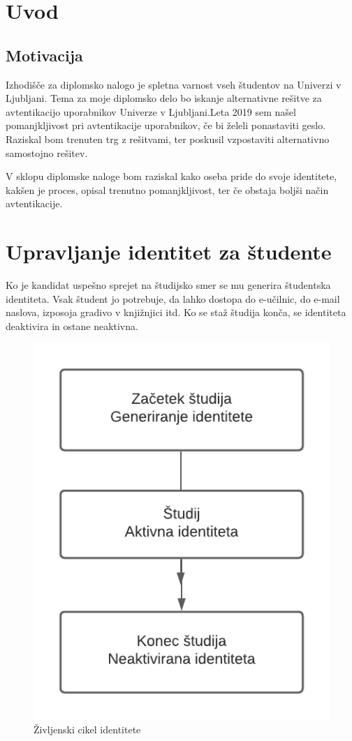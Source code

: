 \documentclass[a4paper,12pt,openright]{book}
\begin{document}
\chapter{Uvod}

\section{Motivacija}
Izhodišče za diplomsko nalogo je spletna varnost vseh študentov na Univerzi v Ljubljani. Tema za moje diplomsko delo bo iskanje alternativne rešitve za avtentikacijo uporabnikov Univerze v Ljubljani.Leta 2019 sem našel pomanjkljivost pri avtentikacije uporabnikov, če bi želeli ponastaviti geslo. Raziskal bom trenuten trg z rešitvami, ter poskusil vzpostaviti alternativno samostojno rešitev. \newline

V sklopu diplomske naloge bom raziskal kako oseba pride do svoje identitete, kakšen je proces, opisal trenutno pomanjkljivost, ter če obstaja boljši način avtentikacije.

\chapter{Upravljanje identitet za študente}

Ko je kandidat uspešno sprejet na študijsko smer se mu generira študentska identiteta. Vsak študent jo potrebuje, da lahko dostopa do e-učilnic, do e-mail naslova, izposoja gradivo v knjižnjici itd. \newline
Ko se staž študija konča, se identiteta deaktivira in ostane neaktivna.

\begin{figure}[]
\includegraphics[]{diploma-FRI-vzorec_11maj2021/Blank diagram.png}
\caption{Življenski cikel identitete}
\label{fig:IDlife}
\end{figure}
\end{document}
